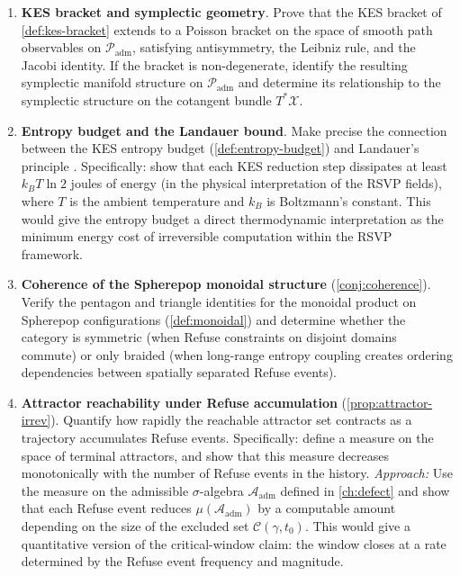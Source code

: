 \documentclass[12pt, oneside]{memoir}
\newcommand{\X}{\mathcal{X}}
\newcommand{\Padm}{\mathcal{P}_{\mathrm{adm}}}
\newcommand{\Aadm}{\mathcal{A}_{\mathrm{adm}}}
\begin{document}
\begin{enumerate}
  \item \textbf{KES bracket and symplectic geometry}.  Prove that the KES bracket of
        \cref{def:kes-bracket} extends to a Poisson bracket on the space of smooth path
        observables on $\Padm$, satisfying antisymmetry, the Leibniz rule, and the
        Jacobi identity.  If the bracket is non-degenerate, identify the resulting
        symplectic manifold structure on $\Padm$ and determine its relationship to the
        symplectic structure on the cotangent bundle $T^*\X$.

  \item \textbf{Entropy budget and the Landauer bound}.  Make precise the connection
        between the KES entropy budget (\cref{def:entropy-budget}) and Landauer's
        principle \cite{landauer1961}.  Specifically: show that each KES reduction step
        dissipates at least $k_B T \ln 2$ joules of energy (in the physical
        interpretation of the RSVP fields), where $T$ is the ambient temperature and
        $k_B$ is Boltzmann's constant.  This would give the entropy budget a direct
        thermodynamic interpretation as the minimum energy cost of irreversible
        computation within the RSVP framework.

  \item \textbf{Coherence of the Spherepop monoidal structure}
        (\cref{conj:coherence}).  Verify the pentagon and triangle identities for the
        monoidal product on Spherepop configurations (\cref{def:monoidal}) and determine
        whether the category is symmetric (when Refuse constraints on disjoint domains
        commute) or only braided (when long-range entropy coupling creates ordering
        dependencies between spatially separated Refuse events).

  \item \textbf{Attractor reachability under Refuse accumulation}
        (\cref{prop:attractor-irrev}).  Quantify how rapidly the reachable attractor
        set contracts as a trajectory accumulates Refuse events.  Specifically: define a
        measure on the space of terminal attractors, and show that this measure decreases
        monotonically with the number of Refuse events in the history.
        \textit{Approach:} Use the measure on the admissible $\sigma$-algebra $\Aadm$
        defined in \cref{ch:defect} and show that each Refuse event reduces $\mu(\Aadm)$
        by a computable amount depending on the size of the excluded set
        $\mathcal{C}(\gamma,t_0)$.  This would give a quantitative version of the
        critical-window claim: the window closes at a rate determined by the Refuse event
        frequency and magnitude.


\end{enumerate}
\end{document}
